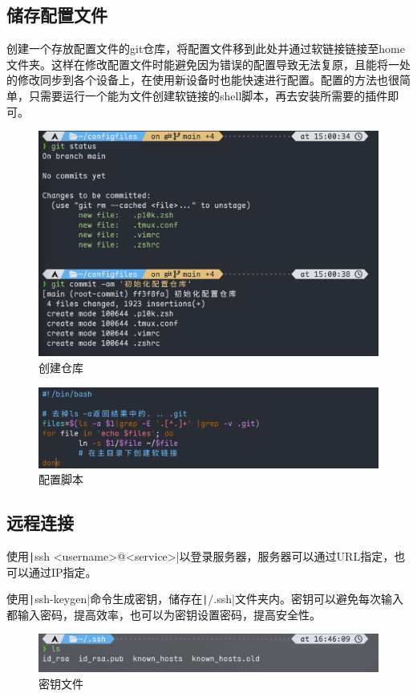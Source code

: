 \documentclass[fontset=ubuntu]{ctexart}
\begin{document}
\subsection{储存配置文件}
创建一个存放配置文件的git仓库，将配置文件移到此处并通过软链接链接至home文件夹。这样在修改配置文件时能避免因为错误的配置导致无法复原，且能将一处的修改同步到各个设备上，在使用新设备时也能快速进行配置。配置的方法也很简单，只需要运行一个能为文件创建软链接的shell脚本，再去安装所需要的插件即可。
\begin{figure}[htb]
    \centering
    \includegraphics[width=0.75\linewidth]{config_1.png}
    \caption{创建仓库}
    \label{fig:config_1}
\end{figure}

\begin{figure}[htb]
    \centering
    \includegraphics[width=0.75\linewidth]{config_2.png}
    \caption{配置脚本}
    \label{fig:config_2}
\end{figure}

\subsection{远程连接}
使用\texttt|ssh <username>@<service>|以登录服务器，服务器可以通过URL指定，也可以通过IP指定。

使用\texttt|ssh-keygen|命令生成密钥，储存在\texttt|/.ssh|文件夹内。密钥可以避免每次输入都输入密码，提高效率，也可以为密钥设置密码，提高安全性。
\begin{figure}[htb]
    \centering
    \includegraphics[width=0.75\linewidth]{ssh_1.png}
    \caption{密钥文件}
    \label{fig:ssh_1}
\end{figure}
\end{document}
